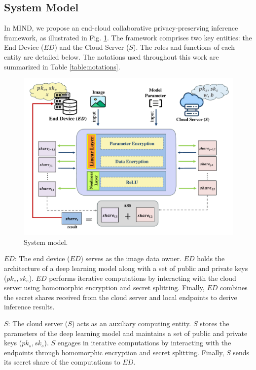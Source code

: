 \documentclass[conference]{IEEEtran}
\begin{document}
\subsection{System Model}
 In MIND, we propose an end-cloud collaborative privacy-preserving inference framework, as illustrated in Fig. \ref{fig:system_model}. The framework comprises two key entities: the End Device ($ED$) and the Cloud Server ($S$). The roles and functions of each entity are detailed below. The notations used throughout this work are summarized in Table \ref{table:notations}.
\begin{figure}[ht]
\includegraphics[width=1\linewidth]{fig1.pdf}
\caption{System model.} \label{fig:system_model}
\end{figure}

$ED$: The end device ($ED$) serves as the image data owner. $ED$ holds the architecture of a deep learning model along with a set of public and private keys ($pk_e,sk_e$). $ED$ performs iterative computations by interacting with the cloud server using homomorphic encryption and secret splitting. Finally, $ED$ combines the secret shares received from the cloud server and local endpoints to derive inference results.

$S$: The cloud server ($S$) acts as an auxiliary computing entity. $S$ stores the parameters of the deep learning model and maintains a set of public and private keys ($pk_s,sk_s$). $S$ engages in iterative computations by interacting with the endpoints through homomorphic encryption and secret splitting. Finally, $S$ sends its secret share of the computations to $ED$.
\end{document}
